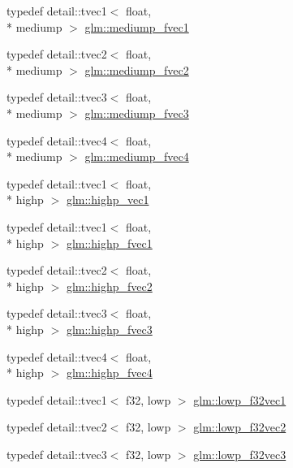 \begin{DoxyCompactItemize}
\item 
typedef detail\-::tvec1$<$ float, \\*
mediump $>$ \hyperlink{group__gtc__type__precision_ga4534af301d5260974cee29f76842d579}{glm\-::mediump\-\_\-fvec1}
\item 
typedef detail\-::tvec2$<$ float, \\*
mediump $>$ \hyperlink{group__gtc__type__precision_ga5c2686caa6838515f6727eea1b64aa05}{glm\-::mediump\-\_\-fvec2}
\item 
typedef detail\-::tvec3$<$ float, \\*
mediump $>$ \hyperlink{group__gtc__type__precision_ga710c3af5ebb05e5e863cff78affd25a6}{glm\-::mediump\-\_\-fvec3}
\item 
typedef detail\-::tvec4$<$ float, \\*
mediump $>$ \hyperlink{group__gtc__type__precision_gaba16de142de00531a1598d83716c6939}{glm\-::mediump\-\_\-fvec4}
\item 
typedef detail\-::tvec1$<$ float, \\*
highp $>$ \hyperlink{group__gtc__type__precision_gab3f08c031846e7a95b49e81c48d920d3}{glm\-::highp\-\_\-vec1}
\item 
typedef detail\-::tvec1$<$ float, \\*
highp $>$ \hyperlink{group__gtc__type__precision_ga5d9f2208253856df60a57925f92ff0c8}{glm\-::highp\-\_\-fvec1}
\item 
typedef detail\-::tvec2$<$ float, \\*
highp $>$ \hyperlink{group__gtc__type__precision_gab58ecc53699d45f4f88d67bbff084c54}{glm\-::highp\-\_\-fvec2}
\item 
typedef detail\-::tvec3$<$ float, \\*
highp $>$ \hyperlink{group__gtc__type__precision_ga79b821fc8ae989b12bb43e2cd3932580}{glm\-::highp\-\_\-fvec3}
\item 
typedef detail\-::tvec4$<$ float, \\*
highp $>$ \hyperlink{group__gtc__type__precision_gae0de2413648d89bf5a8e598e5520a439}{glm\-::highp\-\_\-fvec4}
\item 
typedef detail\-::tvec1$<$ f32, lowp $>$ \hyperlink{group__gtc__type__precision_gae802918ade0497b72c606430830f5ebb}{glm\-::lowp\-\_\-f32vec1}
\item 
typedef detail\-::tvec2$<$ f32, lowp $>$ \hyperlink{group__gtc__type__precision_ga7faa2c9884c87b1e6512a966adad69e4}{glm\-::lowp\-\_\-f32vec2}
\item 
typedef detail\-::tvec3$<$ f32, lowp $>$ \hyperlink{group__gtc__type__precision_ga1f878d91a5f5ab92c756244b62af7248}{glm\-::lowp\-\_\-f32vec3}

\end{DoxyCompactItemize}
